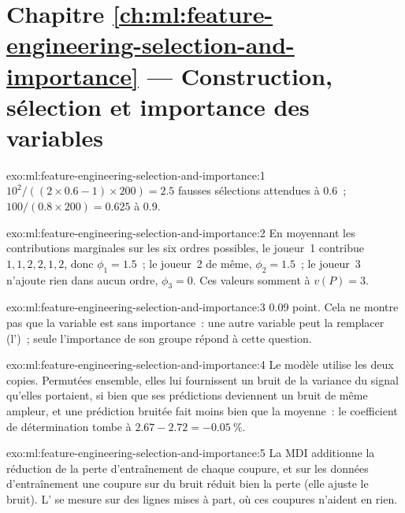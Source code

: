 \section*{Chapitre \ref{ch:ml:feature-engineering-selection-and-importance} --- Construction, sélection et importance des variables}

\begin{solution}{exo:ml:feature-engineering-selection-and-importance:1}
$10^2/((2\times0.6 - 1)\times200) = 2.5$ fausses sélections attendues à 0.6~; $100/(0.8\times200) = 0.625$ à 0.9.
\end{solution}

\begin{solution}{exo:ml:feature-engineering-selection-and-importance:2}
En moyennant les contributions marginales sur les six ordres possibles, le joueur~1 contribue $1, 1, 2, 2, 1, 2$, donc $\phi_1 = 1.5$~;
le joueur~2 de même, $\phi_2 = 1.5$~; le joueur~3 n'ajoute rien dans aucun ordre, $\phi_3 = 0$. Ces valeurs somment à $v(P) = 3$.
\end{solution}

\begin{solution}{exo:ml:feature-engineering-selection-and-importance:3}
0.09 point. Cela ne montre pas que la variable est sans importance~: une autre variable peut la remplacer (l')~; seule l'importance de son groupe répond à cette question.
\end{solution}

\begin{solution}{exo:ml:feature-engineering-selection-and-importance:4}
Le modèle utilise les deux copies. Permutées ensemble, elles lui fournissent un bruit de la variance du signal qu'elles portaient,
si bien que ses prédictions deviennent un bruit de même ampleur, et une prédiction bruitée fait moins bien que la moyenne~: le coefficient de détermination tombe
à $2.67 - 2.72 = -0.05~\%$.
\end{solution}

\begin{solution}{exo:ml:feature-engineering-selection-and-importance:5}
La MDI additionne la réduction de la perte d'entraînement de chaque coupure, et sur les données d'entraînement une coupure sur du bruit
réduit bien la perte (elle ajuste le bruit). L' se mesure sur des lignes mises à part, où ces coupures n'aident en rien.
\end{solution}


